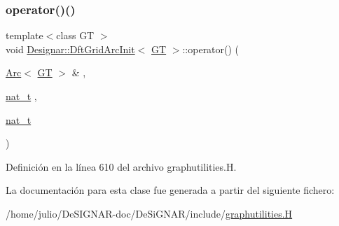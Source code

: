 \subsubsection{\texorpdfstring{operator()()}{operator()()}}
{\footnotesize\ttfamily template$<$class GT $>$ \\
void \hyperlink{class_designar_1_1_dft_grid_arc_init}{Designar\+::\+Dft\+Grid\+Arc\+Init}$<$ \hyperlink{demo-buildgraph_8_c_a3001c40d2c31ca87ed96cd7d1334a55e}{GT} $>$\+::operator() (\begin{DoxyParamCaption}\item[{\hyperlink{namespace_designar_a3f55fb5513d62ff47cbc8f72b8e95d6f}{Arc}$<$ \hyperlink{demo-buildgraph_8_c_a3001c40d2c31ca87ed96cd7d1334a55e}{GT} $>$ \&}]{,  }\item[{\hyperlink{namespace_designar_aa72662848b9f4815e7bf31a7cf3e33d1}{nat\+\_\+t}}]{,  }\item[{\hyperlink{namespace_designar_aa72662848b9f4815e7bf31a7cf3e33d1}{nat\+\_\+t}}]{ }\end{DoxyParamCaption})\hspace{0.3cm}{\ttfamily [inline]}}



Definición en la línea 610 del archivo graphutilities.\+H.



La documentación para esta clase fue generada a partir del siguiente fichero\+:\begin{DoxyCompactItemize}
\item 
/home/julio/\+De\+S\+I\+G\+N\+A\+R-\/doc/\+De\+Si\+G\+N\+A\+R/include/\hyperlink{graphutilities_8_h}{graphutilities.\+H}\end{DoxyCompactItemize}
